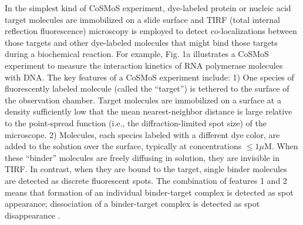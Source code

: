 In the simplest kind of CoSMoS experiment, dye-labeled protein or nucleic acid target molecules are immobilized on a slide surface and TIRF (total internal reflection fluorescence) microscopy is employed to detect co-localizations between those targets and other dye-labeled molecules that might bind those targets during a biochemical reaction. For example, Fig. 1a illustrates a CoSMoS experiment to measure the interaction kinetics of RNA polymerase molecules with DNA. The key features of a CoSMoS experiment include: 1) One species of fluorescently labeled molecule (called the “target”) is tethered to the surface of the observation chamber. Target molecules are immobilized on a surface at a density sufficiently low that the mean nearest-neighbor distance is large relative to the point-spread function (i.e., the diffraction-limited spot size) of the microscope. 2) Molecules, each species labeled with a different dye color, are added to the solution over the surface, typically at concentrations $\leq 1 \mu$M. When these “binder” molecules are freely diffusing in solution, they are invisible in TIRF. In contrast, when they are bound to the target, single binder molecules are detected as discrete fluorescent spots. The combination of features 1 and 2 means that formation of an individual binder-target complex is detected as spot appearance; dissociation of a binder-target complex is detected as spot disappearance \cite{Friedman2006-kb, Friedman2015-nx}.

